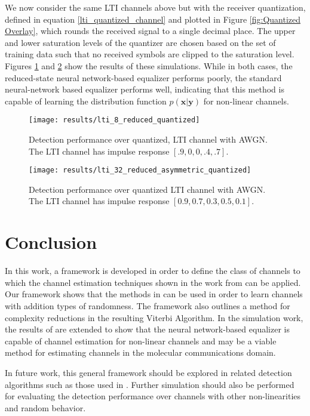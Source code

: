 \par
We now consider the same LTI channels above but with the receiver quantization, defined in equation \eqref{lti_quantized_channel} and plotted in Figure \ref{fig:Quantized Overlay}, which rounds the received signal to a single decimal place. The upper and lower saturation levels of the quantizer are chosen based on the set of training data such that no received symbols are clipped to the saturation level.
Figures \ref{fig:LTI performance quantized reduced} and \ref{fig:LTI performance quantized} show the results of these simulations. While in both cases, the reduced-state neural network-based equalizer performs poorly, the standard neural-network based equalizer performs well, indicating that this method is capable of learning the distribution function $p(\mathbf{x}|\mathbf{y})$ for non-linear channels. 

\begin{figure}[htp]
	\texttt{[image: results/lti\_8\_reduced\_quantized]}
		  \caption{Detection performance over quantized, LTI channel with AWGN. The LTI channel has impulse response  $[.9, 0, 0, .4, .7]$. }
	  \label{fig:LTI performance quantized reduced}
\end{figure}

\begin{figure}[H]
	\texttt{[image: results/lti\_32\_reduced\_asymmetric\_quantized]}
		  \caption{Detection performance over quantized LTI channel with AWGN.  The LTI channel has impulse response  $[0.9, 0.7, 0.3, 0.5, 0.1]$.}
	  \label{fig:LTI performance quantized}
\end{figure}



\section{Conclusion}
In this work, a framework is developed in order to define the class of channels to which the channel estimation techniques shown in the work from \cite{shlezinger2019viterbinet} can be applied. Our framework shows that the methods in \cite{shlezinger2019viterbinet} can be used in order to learn channels with addition types of randomness. The framework also outlines a method for complexity reductions in the resulting Viterbi Algorithm. 
 In the simulation work, the results of \cite{shlezinger2019viterbinet} are extended to show that the neural network-based equalizer is capable of channel estimation for  non-linear channels and may be a viable method for estimating channels in the molecular communications domain. 
 \par 
 In future work, this general framework should be explored in related detection algorithms such as those used in \cite{shlezinger2020datadriven}. Further simulation should also be performed for evaluating the detection performance over channels with other non-linearities and random behavior. 


